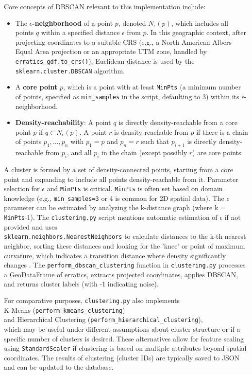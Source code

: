 \documentclass[
11pt, %
english, %
singlespacing, %
headsepline, %
]{MastersDoctoralThesis} %
\begin{document}
Core concepts of DBSCAN relevant to this implementation include:
\begin{itemize}
    \item The \textbf{$\epsilon$-neighborhood} of a point $p$, denoted $N_\epsilon(p)$,
    which includes all points $q$ within a specified distance $\epsilon$ from $p$.
    In this geographic context, after projecting coordinates to a suitable CRS (e.g., a North 
    American Albers Equal Area projection or an appropriate UTM zone, handled by
    \texttt{erratics\_gdf.to\_crs()}), Euclidean distance is used by the 
    \texttt{sklearn.cluster.DBSCAN} algorithm.
    \item A \textbf{core point} $p$, 
    which is a point with at least \texttt{MinPts} (a minimum number of points, specified as \texttt{min\_samples} in the script, defaulting to 3) 
    within its $\epsilon$-neighborhood.
    \item \textbf{Density-reachability}: A point $q$ is directly density-reachable from a core point $p$ if $q \in N_\epsilon(p)$. A point $r$ is density-reachable from $p$ if there is a chain of points $p_1, ..., p_n$ with $p_1 = p$ and $p_n = r$ such that $p_{i+1}$ is directly density-reachable from $p_i$, and all $p_i$ in the chain (except possibly $r$) are core points.
\end{itemize}
A cluster is formed by a set of density-connected points, starting from a core point and expanding to include all points density-reachable from it. Parameter selection for $\epsilon$ and \texttt{MinPts} is critical. \texttt{MinPts} is often set based on domain knowledge (e.g., \texttt{min\_samples=3} or 4 is common for 2D spatial data). The 
$\epsilon$ parameter can be estimated by analyzing the k-distance graph (where k = \texttt{MinPts}-1). The \texttt{clustering.py} script mentions automatic estimation of $\epsilon$ if not provided and uses \\
\texttt{sklearn.neighbors.NearestNeighbors} to calculate distances to the k-th 
nearest neighbor, sorting these distances and looking for the 'knee' or point of maximum curvature, which indicates a transition distance where density significantly changes \cite{Ester1996}. 
The \texttt{perform\_dbscan\_clustering} function in \texttt{clustering.py} 
processes a GeoDataFrame of erratics, extracts projected coordinates, applies DBSCAN, and returns cluster labels (with -1 indicating noise).

For comparative purposes, \texttt{clustering.py} also implements\\
K-Means (\texttt{perform\_kmeans\_clustering}) \\
and Hierarchical Clustering (\texttt{perform\_hierarchical\_clustering}), \\
which may be useful under different 
assumptions about cluster structure or if a specific number of clusters is desired. These 
alternatives allow for feature scaling using \texttt{StandardScaler} if clustering is 
based on multiple attributes beyond spatial coordinates. The results of clustering 
(cluster IDs) are typically saved to JSON and can be updated to the database.
\end{document}
